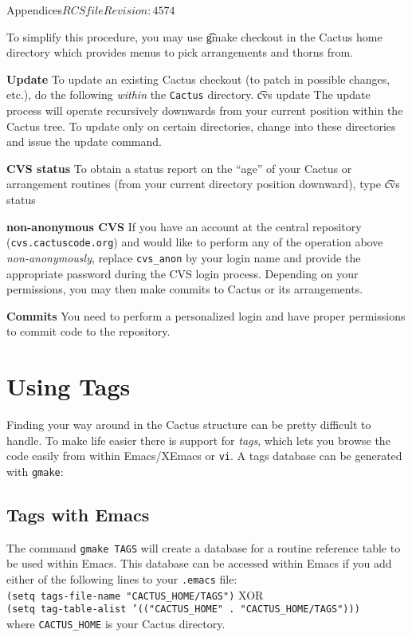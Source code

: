 \begin{cactuspart}{Appendices}{$RCSfile$}{$Revision: 4574 $}
\begin{Lentry}
To simplify this procedure, you may use {\t gmake checkout} in the Cactus
home directory which provides menus to pick arrangements and thorns from.


\item[{\bf Update}] To update an existing Cactus checkout (to patch in
  possible changes, etc.), do the following \emph{within} the {\tt Cactus} directory.
  {\t
    cvs update
    }
  The update process will operate recursively downwards from your current position
  within the Cactus tree. To update only on certain directories, change
  into these directories and issue the update command.
\item[{\bf CVS status}] To obtain a status report on the ``age'' of your
  Cactus or arrangement routines (from your current directory position
  downward), type
  {\t
    cvs status
    }
\item[{\bf non-anonymous CVS}] If you have an account at the central
  repository ({\tt cvs.cactuscode.org}) and would like to perform
  any of the operation above
  \emph{non-anonymously}, replace {\tt cvs\_anon} by your login name
  and provide the appropriate password during the CVS login
  process. Depending on your permissions, you may then make commits to Cactus
  or its arrangements.
\item[{\bf Commits}] You need to perform a personalized login and have
  proper permissions to commit code to the repository.
\end{Lentry}


\chapter{Using Tags}
\label{sec:Appendix.tags}
Finding your way around in the Cactus structure can be pretty
difficult to handle. To make life easier there is support for \textit{tags},
which lets you browse the code easily from within Emacs/XEmacs or {\tt vi}.
A tags database can be generated with {\tt gmake}:

\section{Tags with Emacs}

The command {\tt gmake TAGS} will create a database for a routine reference
table to be used within Emacs. This database can be accessed within
Emacs if you add either of the following lines to your {\tt .emacs} file:\\
{\tt (setq tags-file-name "CACTUS\_HOME/TAGS")} XOR \\
{\tt (setq tag-table-alist '(("CACTUS\_HOME" . "CACTUS\_HOME/TAGS")))}\\
where {\tt CACTUS\_HOME} is your Cactus directory.\\


\end{cactuspart}
